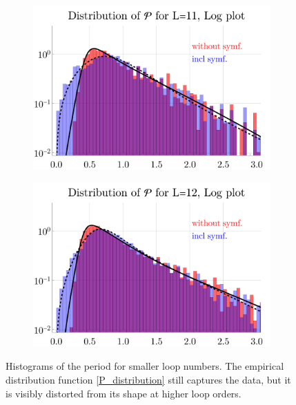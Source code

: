 \documentclass[12pt,a4paper]{article}
\renewcommand{\|}{\rule[-0.4ex]{0.2ex}{1.2em}}
\begin{document}
\begin{figure}[htbp]
	\centering
	\begin{subfigure}[b]{.48 \textwidth}
		\includegraphics[width=\linewidth]{distribution_P_11_log}
		\subcaption{}
	\end{subfigure}
	\begin{subfigure}[b]{.48 \textwidth}
		\includegraphics[width=\linewidth]{distribution_P_12_log}
		\subcaption{}
	\end{subfigure}
	
	\caption{Histograms of the   period for smaller loop numbers. The empirical distribution function \cref{P_distribution} still captures the data, but it is visibly distorted from its shape at higher loop orders. }
	\label{fig:histograms_log_small}
\end{figure}
\end{document}
